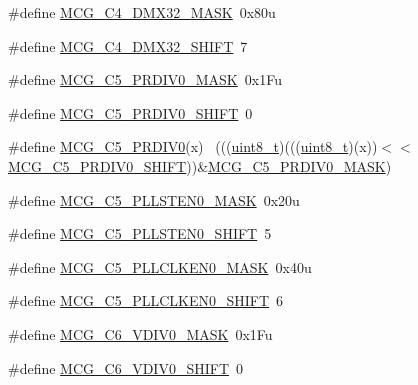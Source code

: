 \begin{DoxyCompactItemize}
\#define \hyperlink{group___m_c_g___register___masks_ga5d16ac35cf87b3cdeeefca1c16a0eda0}{M\+C\+G\+\_\+\+C4\+\_\+\+D\+M\+X32\+\_\+\+M\+A\+SK}~0x80u
\item 
\#define \hyperlink{group___m_c_g___register___masks_ga12d73b2d4a4fd1f2fb21a1cbe87aaa83}{M\+C\+G\+\_\+\+C4\+\_\+\+D\+M\+X32\+\_\+\+S\+H\+I\+FT}~7
\item 
\#define \hyperlink{group___m_c_g___register___masks_ga28ab0b9007f9941707395660db088172}{M\+C\+G\+\_\+\+C5\+\_\+\+P\+R\+D\+I\+V0\+\_\+\+M\+A\+SK}~0x1\+Fu
\item 
\#define \hyperlink{group___m_c_g___register___masks_ga452026beec3bec5a580d151e15d83f30}{M\+C\+G\+\_\+\+C5\+\_\+\+P\+R\+D\+I\+V0\+\_\+\+S\+H\+I\+FT}~0
\item 
\#define \hyperlink{group___m_c_g___register___masks_ga4671734fc6670aae81260260e8af1861}{M\+C\+G\+\_\+\+C5\+\_\+\+P\+R\+D\+I\+V0}(x)                                              ~(((\hyperlink{_p_e___types_8h_aba7bc1797add20fe3efdf37ced1182c5}{uint8\+\_\+t})(((\hyperlink{_p_e___types_8h_aba7bc1797add20fe3efdf37ced1182c5}{uint8\+\_\+t})(x))$<$$<$\hyperlink{group___m_c_g___register___masks_ga452026beec3bec5a580d151e15d83f30}{M\+C\+G\+\_\+\+C5\+\_\+\+P\+R\+D\+I\+V0\+\_\+\+S\+H\+I\+FT}))\&\hyperlink{group___m_c_g___register___masks_ga28ab0b9007f9941707395660db088172}{M\+C\+G\+\_\+\+C5\+\_\+\+P\+R\+D\+I\+V0\+\_\+\+M\+A\+SK})
\item 
\#define \hyperlink{group___m_c_g___register___masks_ga9bec4ed23caf6a431b506e944d928080}{M\+C\+G\+\_\+\+C5\+\_\+\+P\+L\+L\+S\+T\+E\+N0\+\_\+\+M\+A\+SK}~0x20u
\item 
\#define \hyperlink{group___m_c_g___register___masks_ga486796db598fbf2f07f39d71453f49b6}{M\+C\+G\+\_\+\+C5\+\_\+\+P\+L\+L\+S\+T\+E\+N0\+\_\+\+S\+H\+I\+FT}~5
\item 
\#define \hyperlink{group___m_c_g___register___masks_ga73671453b8f8804784e5b7e67551726d}{M\+C\+G\+\_\+\+C5\+\_\+\+P\+L\+L\+C\+L\+K\+E\+N0\+\_\+\+M\+A\+SK}~0x40u
\item 
\#define \hyperlink{group___m_c_g___register___masks_gaa66ceed70e1055a31e46c60a502b8eb7}{M\+C\+G\+\_\+\+C5\+\_\+\+P\+L\+L\+C\+L\+K\+E\+N0\+\_\+\+S\+H\+I\+FT}~6
\item 
\#define \hyperlink{group___m_c_g___register___masks_gacf93ac207865bd372d9148f10dce7267}{M\+C\+G\+\_\+\+C6\+\_\+\+V\+D\+I\+V0\+\_\+\+M\+A\+SK}~0x1\+Fu
\item 
\#define \hyperlink{group___m_c_g___register___masks_ga92208f56fc7ce68a0a8ff14ab5c3b2f6}{M\+C\+G\+\_\+\+C6\+\_\+\+V\+D\+I\+V0\+\_\+\+S\+H\+I\+FT}~0
$$
\end{DoxyCompactItemize}
